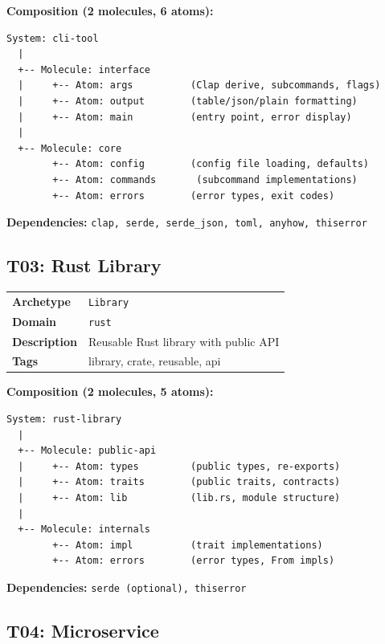 \documentclass[11pt,a4paper,twoside]{article}
\theoremstyle{definition}
\theoremstyle{plain}
\theoremstyle{remark}
\begin{document}
\medskip\noindent\textbf{Composition (2 molecules, 6 atoms):}

\begin{lstlisting}
System: cli-tool
  |
  +-- Molecule: interface
  |     +-- Atom: args          (Clap derive, subcommands, flags)
  |     +-- Atom: output        (table/json/plain formatting)
  |     +-- Atom: main          (entry point, error display)
  |
  +-- Molecule: core
        +-- Atom: config        (config file loading, defaults)
        +-- Atom: commands       (subcommand implementations)
        +-- Atom: errors        (error types, exit codes)
\end{lstlisting}

\textbf{Dependencies:} \texttt{clap, serde, serde\_json, toml, anyhow, thiserror}

\subsection{T03: Rust Library}\label{sec:t03}

\begin{tabularx}{\textwidth}{l X}
\toprule
\textbf{Archetype} & \texttt{Library} \\
\textbf{Domain} & \texttt{rust} \\
\textbf{Description} & Reusable Rust library with public API \\
\textbf{Tags} & library, crate, reusable, api \\
\bottomrule
\end{tabularx}

\medskip\noindent\textbf{Composition (2 molecules, 5 atoms):}

\begin{lstlisting}
System: rust-library
  |
  +-- Molecule: public-api
  |     +-- Atom: types         (public types, re-exports)
  |     +-- Atom: traits        (public traits, contracts)
  |     +-- Atom: lib           (lib.rs, module structure)
  |
  +-- Molecule: internals
        +-- Atom: impl          (trait implementations)
        +-- Atom: errors        (error types, From impls)
\end{lstlisting}

\textbf{Dependencies:} \texttt{serde (optional), thiserror}

\subsection{T04: Microservice}\label{sec:t04}
\end{document}
